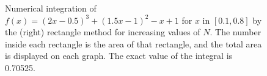 \begin{figure}
\centering
{}
\caption{Numerical integration of $f(x) = (2 x-0.5)^3+(1.5 x-1)^2-x+1$ for $x$ in $[0.1,0.8]$
by the (right) rectangle method for increasing values of $N$. The number inside each rectangle is
the area of that rectangle, and the total area is displayed on each graph.
The exact value of the integral is 0.70525.}\label{fig:rectangle}
\end{figure}

